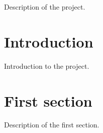 Description of the project.



 \hypertarget{index_s0}{}\section{Introduction}\label{index_s0}
Introduction to the project.



 \hypertarget{index_s1}{}\section{First section}\label{index_s1}
Description of the first section. 